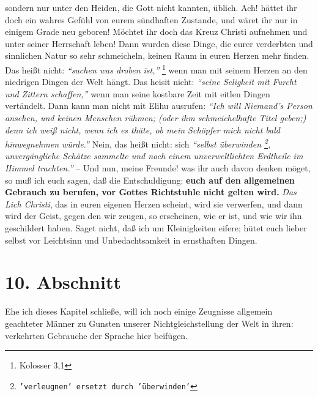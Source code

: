 sondern nur unter den Heiden, die
Gott nicht kannten, üblich. Ach! hättet ihr doch ein wahres Gefühl von eurem
sündhaften Zustande, und wäret ihr nur in einigem
Grade neu geboren! Möchtet ihr
doch das Kreuz Christi aufnehmen und unter seiner
Herrschaft leben! Dann wurden
diese Dinge, die eurer verderbten und sinnlichen
Natur so sehr schmeicheln,
keinen Raum in euren Herzen mehr finden. Das heißt nicht:
\textit{"`suchen was droben ist,"'}
\footnote{Kolosser 3,1}
wenn man mit seinem Herzen an den niedrigen Dingen der Welt hängt. Das
heisit nicht:
\textit{"`seine Seligkeit mit Furcht und Zittern schaffen,"'} wenn man
seine kostbare Zeit mit eitlen Dingen vertändelt. Dann kann man nicht mit
Elihu
ausrufen:
\textit{"`Ich will Niemand's Person ansehen, und keinen Menschen rühmen; (oder
ihm schmeichelhafte Titel geben;) denn ich weiß nicht, wenn ich es thäte, ob
mein Schöpfer mich nicht bald hinwegnehmen würde."'}
Nein, das heißt nicht: sich
\textit{"`selbst überwinden
\footnote{\texttt{'verleugnen' ersetzt durch 'überwinden'}}, unvergängliehe
Schätze sammelte und noch einem
unverweltlichten Erdtheile im Himmel trachten."'} -- Und nun, meine Freunde! was
ihr auch davon denken möget, so muß ich euch sagen, daß die Entschuldigung:
\textbf{euch
auf den allgemeinen Gebrauch zu berufen, vor Gottes Richtstuhle nicht gelten
wird.} \textit{Das Lich Christi}, das in euren eigenen Herzen
scheint, wird sie
verwerfen, und dann wird der Geist, gegen den wir zeugen, so erscheinen, wie er
ist, und wie wir ihn geschildert haben. Saget nicht, daß ich um Kleinigkeiten
eifere; hütet euch lieber selbst vor Leichtsinn und Unbedachtsamkeit in
ernsthaften Dingen.

\section{10. Abschnitt} \label{kap10_ab10}

Ehe ich dieses Kapitel schließe, will ich noch einige Zeugnisse allgemein
geachteter Männer zu Gunsten unserer Nichtgleichstellung der Welt in ihren:
verkehrten Gebrauche der Sprache hier beifügen.

\medskip

